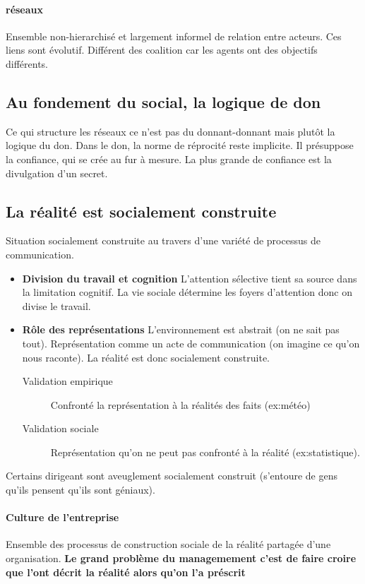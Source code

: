 \documentclass[11pt]{article} %
\begin{document}
		\paragraph{réseaux} Ensemble non-hierarchisé et largement informel de relation entre acteurs. Ces 
		liens sont évolutif. Différent des coalition car les agents ont des objectifs différents.
	\subsection{Au fondement du social, la logique de don}
		Ce qui structure les réseaux ce n'est pas du donnant-donnant mais plutôt la logique du don. Dans le
		don, la norme de réprocité reste implicite. Il présuppose la confiance, qui se crée au fur à mesure. La 
		plus grande de confiance est la divulgation d'un secret.
	\subsection{La réalité est socialement construite}
		Situation socialement construite au travers d'une variété de processus de communication. 
		\begin{itemize}
			\item \textbf{Division du travail et cognition} L'attention sélective tient sa source dans la limitation
			cognitif. La vie sociale détermine les foyers d'attention donc on divise le travail.
			\item \textbf{Rôle des représentations} L'environnement est abstrait (on ne sait pas tout). 
			Représentation comme un acte de  communication (on imagine ce qu'on nous raconte). La réalité 
			est donc socialement construite.
			\begin{description}
				\item[Validation empirique] Confronté la représentation à la réalités des faits (ex:météo)
				\item[Validation sociale] Représentation qu'on ne peut pas confronté à la réalité 		
				(ex:statistique).
			\end{description}
		\end{itemize}
		Certains dirigeant sont aveuglement socialement construit (s'entoure de gens qu'ils pensent qu'ils sont 	
		géniaux).
		\paragraph{Culture de l'entreprise} Ensemble des processus de construction sociale de la réalité 
		partagée d'une organisation.
		\textbf{Le grand problème du managemement  c'est de faire croire que l'ont décrit la réalité alors 
		qu'on l'a préscrit}
\end{document}
